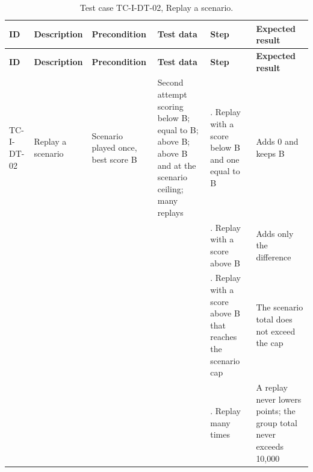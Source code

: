 {\footnotesize{}\renewcommand{\arraystretch}{1.1}
\begin{longtable}{|>{\raggedright\arraybackslash}p{}|>{\raggedright\arraybackslash}p{}|>{\raggedright\arraybackslash}p{}|>{\raggedright\arraybackslash}p{}|>{\raggedright\arraybackslash}p{}|>{\raggedright\arraybackslash}p{}|}
\caption{Test case TC-I-DT-02, Replay a scenario.} \\
\hline
\textbf{ID} & \textbf{Description} & \textbf{Precondition} & \textbf{Test data} & \textbf{Step} & \textbf{Expected result} \\ \hline
\endfirsthead
\hline
\textbf{ID} & \textbf{Description} & \textbf{Precondition} & \textbf{Test data} & \textbf{Step} & \textbf{Expected result} \\ \hline
\endhead
TC-I-DT-02 & Replay a scenario & Scenario played once, best score B & Second attempt scoring below B; equal to B; above B; above B and at the scenario ceiling; many replays & 1. Replay with a score below B and one equal to B & Adds 0 and keeps B \\ \cline{5-6}
 &  &  &  & 2. Replay with a score above B & Adds only the difference \\ \cline{5-6}
 &  &  &  & 3. Replay with a score above B that reaches the scenario cap & The scenario total does not exceed the cap \\ \cline{5-6}
 &  &  &  & 4. Replay many times & A replay never lowers points; the group total never exceeds 10,000 \\ \hline
\end{longtable}
}

